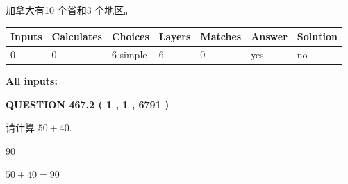 \documentclass{ctexart}
\begin{document}
 
加拿大有10 个省和3 个地区。
 
 
\noindent{}
 
 
   
   
   
   
\noindent\begin{tabular}{|l|l|l|l|l|l|l|}
 \hline
Inputs & Calculates & Choices & Layers & Matches & Answer & Solution \\ \hline
 0  & 
 0  & 
 6
  simple  
  & 
 6  & 
 0  & 
  yes & 
  no 
  \\ \hline
 \end{tabular}
   
   
   
   
\noindent{}
   
   
   
   
\noindent\vspace{0.1in}\hspace{-0.08in} {\textbf{\Large{All inputs: }}}
   
   
  
\vspace{0.2in}
  
{\textbf{\Large{QUESTION
467.2 
 ( 1 , 1 , 6791 )
}}}
  
  
 
请计算 $ %
50 +  %
40 $.
 
 
 
\noindent{}
 
 

90
 
 
\noindent{}
 
 

 
 
 
\noindent{}
 
 

$ %
50 +  %
40=   %
90$
 
 
\noindent{}
 
 

 
   
   
   
\end{document}
